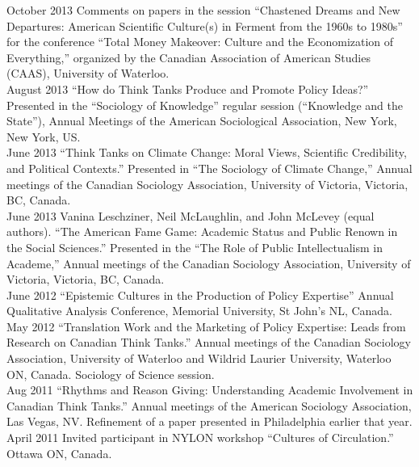 \documentclass[9pt,usenames,dvipsnames]{article}
\begin{document}
\ind October 2013 Comments on papers in the session ``Chastened Dreams and New Departures: American Scientific Culture(s) in Ferment from the 1960s to 1980s'' for the conference ``Total Money Makeover: Culture and the Economization of Everything,'' organized by the Canadian Association of American Studies (CAAS), University of Waterloo. \\

\ind August 2013 ``How do Think Tanks Produce and Promote Policy Ideas?'' Presented in the ``Sociology of Knowledge'' regular session (``Knowledge and the State''), Annual Meetings of the American Sociological Association, New York, New York, US. \\

\ind June 2013 ``Think Tanks on Climate Change: Moral Views, Scientific Credibility, and Political Contexts.'' Presented in ``The Sociology of Climate Change,'' Annual meetings of the Canadian Sociology Association, University of Victoria, Victoria, BC, Canada. \\

\ind June 2013 Vanina Leschziner, Neil McLaughlin, and John McLevey (equal authors). ``The American Fame Game: Academic Status and Public Renown in the Social Sciences.'' Presented in the ``The Role of Public Intellectualism in Academe,'' Annual meetings of the Canadian Sociology Association, University of Victoria, Victoria, BC, Canada. \\

\ind June 2012 ``Epistemic Cultures in the Production of Policy Expertise'' Annual Qualitative Analysis Conference, Memorial University, St John's NL, Canada.\\

\ind May 2012 ``Translation Work and the Marketing of Policy Expertise: Leads from Research on Canadian Think Tanks.'' Annual meetings of the Canadian Sociology Association, University of Waterloo and Wildrid Laurier University, Waterloo ON, Canada. Sociology of Science session.\\

\ind Aug 2011 ``Rhythms and Reason Giving: Understanding Academic Involvement in Canadian Think Tanks.'' Annual meetings of the American Sociology Association, Las Vegas, NV. Refinement of a paper presented in Philadelphia earlier that year. \\

\ind April 2011 Invited participant in NYLON workshop ``Cultures of Circulation.'' Ottawa ON, Canada.\\
\end{document}
